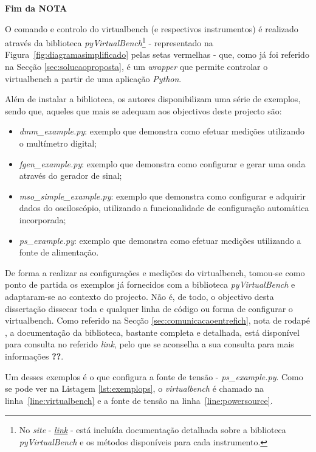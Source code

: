 \textbf{Fim da NOTA}

O comando e controlo do \acrshort{virtualbench} (e respectivos instrumentos) é realizado através da biblioteca \textit{pyVirtualBench}\footnote{No \textit{site} - \href{https://pymeasure.readthedocs.io/en/latest/api/instruments/ni/virtualbench.html}{\textit{link}} - está incluída documentação detalhada sobre a biblioteca \textit{pyVirtualBench} e os métodos disponíveis para cada instrumento.\label{fnlabel}} - representado na Figura~\ref{fig:diagramasimplificado} pelas setas vermelhas - que, como já foi referido na Secção \ref{sec:solucaoproposta}, é um \textit{wrapper} que permite controlar o \acrshort{virtualbench} a partir de uma aplicação \textit{Python}.

Além de instalar a biblioteca, os autores disponibilizam uma série de exemplos, sendo que, aqueles que mais se adequam aos objectivos deste projecto são:
\begin{itemize}
	\item \textit{dmm\_example.py}: exemplo que demonstra como efetuar medições utilizando o multímetro digital;
	\item \textit{fgen\_example.py}: exemplo que demonstra como configurar e gerar uma onda através do gerador de sinal;
	\item \textit{mso\_simple\_example.py}: exemplo que demonstra como configurar e adquirir dados do osciloscópio, utilizando a funcionalidade de configuração automática incorporada;
	\item \textit{ps\_example.py}: exemplo que demonstra como efetuar medições utilizando a fonte de alimentação.
\end{itemize}

De forma a realizar as configurações e medições do \acrshort{virtualbench}, tomou-se como ponto de partida os exemplos já fornecidos com a biblioteca \textit{pyVirtualBench} e adaptaram-se ao contexto do projecto. Não é, de todo, o objectivo desta dissertação dissecar toda e qualquer linha de código ou forma de configurar o \acrshort{virtualbench}. Como referido na Secção \ref{sec:comunicacaoentrefich}, nota de rodapé , a documentação da biblioteca, bastante completa e detalhada, está disponível para consulta no referido \textit{link}, pelo que se aconselha a sua consulta para mais informações \textbf{??}. 

Um desses exemplos é o que configura a fonte de tensão - \textit{ps\_example.py}. Como se pode ver na Listagem \ref{lst:exemplops}, o \textit{virtualbench} é chamado na linha~\ref{line:virtualbench} e a fonte de tensão na linha~\ref{line:powersource}. 

